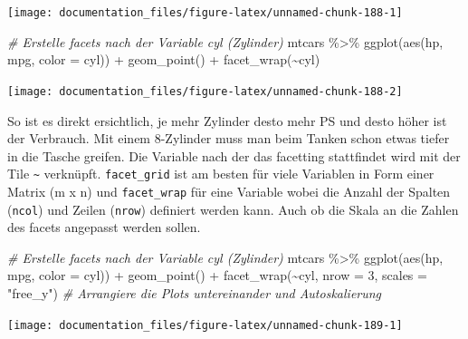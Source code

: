 \documentclass[
]{article}
\newenvironment{Shaded}{\begin{snugshade}}{\end{snugshade}}
\newcommand{\AttributeTok}[1]{\textcolor[rgb]{0.77,0.63,0.00}{#1}}
\newcommand{\CommentTok}[1]{\textcolor[rgb]{0.56,0.35,0.01}{\textit{#1}}}
\newcommand{\DecValTok}[1]{\textcolor[rgb]{0.00,0.00,0.81}{#1}}
\newcommand{\FunctionTok}[1]{\textcolor[rgb]{0.00,0.00,0.00}{#1}}
\newcommand{\NormalTok}[1]{#1}
\newcommand{\SpecialCharTok}[1]{\textcolor[rgb]{0.00,0.00,0.00}{#1}}
\newcommand{\StringTok}[1]{\textcolor[rgb]{0.31,0.60,0.02}{#1}}
\begin{document}
\begin{center}\texttt{[image: documentation\_files/figure-latex/unnamed-chunk-188-1]} \end{center}

\begin{Shaded}
\begin{Highlighting}[]
\CommentTok{\# Erstelle facets nach der Variable cyl (Zylinder)}
\NormalTok{mtcars }\SpecialCharTok{\%\textgreater{}\%}
  \FunctionTok{ggplot}\NormalTok{(}\FunctionTok{aes}\NormalTok{(hp, mpg, }\AttributeTok{color =}\NormalTok{ cyl)) }\SpecialCharTok{+}
  \FunctionTok{geom\_point}\NormalTok{() }\SpecialCharTok{+}
  \FunctionTok{facet\_wrap}\NormalTok{(}\SpecialCharTok{\textasciitilde{}}\NormalTok{cyl)}
\end{Highlighting}
\end{Shaded}

\begin{center}\texttt{[image: documentation\_files/figure-latex/unnamed-chunk-188-2]} \end{center}

So ist es direkt ersichtlich, je mehr Zylinder desto mehr PS und desto höher ist der Verbrauch. Mit einem 8-Zylinder muss man beim Tanken schon etwas tiefer in die Tasche greifen. Die Variable nach der das facetting stattfindet wird mit der Tile \texttt{\textasciitilde{}} verknüpft. \texttt{facet\_grid} ist am besten für viele Variablen in Form einer Matrix (m x n) und \texttt{facet\_wrap} für eine Variable wobei die Anzahl der Spalten (\texttt{ncol}) und Zeilen (\texttt{nrow}) definiert werden kann. Auch ob die Skala an die Zahlen des facets angepasst werden sollen.

\begin{Shaded}
\begin{Highlighting}[]
\CommentTok{\# Erstelle facets nach der Variable cyl (Zylinder)}
\NormalTok{mtcars }\SpecialCharTok{\%\textgreater{}\%}
  \FunctionTok{ggplot}\NormalTok{(}\FunctionTok{aes}\NormalTok{(hp, mpg, }\AttributeTok{color =}\NormalTok{ cyl)) }\SpecialCharTok{+}
  \FunctionTok{geom\_point}\NormalTok{() }\SpecialCharTok{+}
  \FunctionTok{facet\_wrap}\NormalTok{(}\SpecialCharTok{\textasciitilde{}}\NormalTok{cyl, }\AttributeTok{nrow =} \DecValTok{3}\NormalTok{, }\AttributeTok{scales =} \StringTok{"free\_y"}\NormalTok{) }\CommentTok{\# Arrangiere die Plots untereinander und Autoskalierung}
\end{Highlighting}
\end{Shaded}

\begin{center}\texttt{[image: documentation\_files/figure-latex/unnamed-chunk-189-1]} \end{center}
\end{document}
